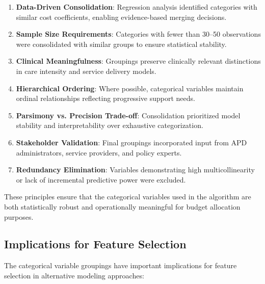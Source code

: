 \begin{enumerate}
    \item \textbf{Data-Driven Consolidation}: Regression analysis identified categories with similar cost coefficients, enabling evidence-based merging decisions.
    
    \item \textbf{Sample Size Requirements}: Categories with fewer than 30--50 observations were consolidated with similar groups to ensure statistical stability.
    
    \item \textbf{Clinical Meaningfulness}: Groupings preserve clinically relevant distinctions in care intensity and service delivery models.
    
    \item \textbf{Hierarchical Ordering}: Where possible, categorical variables maintain ordinal relationships reflecting progressive support needs.
    
    \item \textbf{Parsimony vs. Precision Trade-off}: Consolidation prioritized model stability and interpretability over exhaustive categorization.
    
    \item \textbf{Stakeholder Validation}: Final groupings incorporated input from APD administrators, service providers, and policy experts.
    
    \item \textbf{Redundancy Elimination}: Variables demonstrating high multicollinearity or lack of incremental predictive power were excluded.
\end{enumerate}

These principles ensure that the categorical variables used in the algorithm are both statistically robust and operationally meaningful for budget allocation purposes.

\subsection{Implications for Feature Selection}
\label{subsec:categorical-implications}

The categorical variable groupings have important implications for feature selection in alternative modeling approaches:

